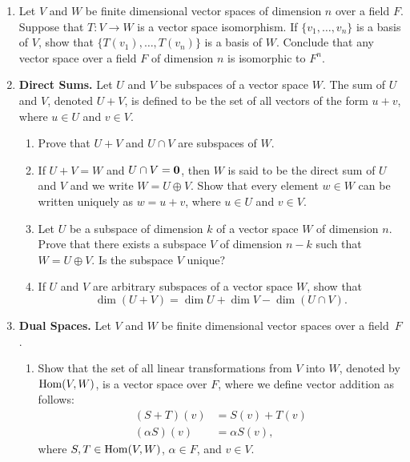 {\begin{enumerate}
\begin{enumerate}
\end{enumerate}


\item
Let $V$ and $W$ be finite dimensional vector spaces of dimension $n$
over a field $F$. Suppose that  $T: V \rightarrow W$ is a vector space
isomorphism.  If $\{ v_1, \ldots, v_n \}$ is a basis of $V$, show that
$\{ T(v_1), \ldots, T(v_n) \}$ is a basis of $W$. Conclude that any
vector space over a field $F$ of dimension $n$ is isomorphic to $F^n$. 


\item
{\bf Direct Sums.} 
Let $U$ and $V$ be subspaces of a vector space $W$. The sum of $U$ and
$V$, denoted $U + V$, is defined to be the set of all vectors of the
form $u + v$, where $u \in U$ and $v \in V$. 
\begin{enumerate}

   \item
Prove that $U + V$ and $U \cap V$ are subspaces of $W$.

   \item
If $U + V = W$ and $U \cap V = {\bold 0}$, then $W$ is said to be the
{\bfi direct sum\/} of $U$ and $V$ and we write $W = U \oplus
V$\label{notedirectsum}.
Show that every element $w \in W$ can be written uniquely as $w = u +
v$, where $u \in U$ and $v \in V$.

   \item
Let $U$ be a subspace of dimension $k$ of a vector space $W$ of
dimension $n$. Prove that there exists a subspace $V$ of dimension
$n-k$ such that $W = U \oplus V$.  Is the subspace $V$ unique?

   \item
If $U$ and $V$ are arbitrary subspaces of a vector space $W$, show
that 
\[
\dim( U + V) = \dim U + \dim V - \dim( U \cap V).
\]

\end{enumerate}


\item
{\bf Dual Spaces.} 
Let $V$ and $W$ be finite dimensional vector spaces over a field~$F$. 
\begin{enumerate}

   \item
Show that the set of all linear transformations from $V$ into $W$,
denoted by $\operatorname{Hom}(V, W)$\label{noteHom}, 
is a vector space over $F$, where we
define vector addition as follows:
\begin{align*}
(S + T)(v) &=  S(v) +T(v) \\
(\alpha S)(v) & =  \alpha S(v),
\end{align*}
where $S, T \in \operatorname{Hom}(V, W)$, $\alpha \in F$, and $v \in V$.
 

\end{enumerate}
\end{enumerate}}
